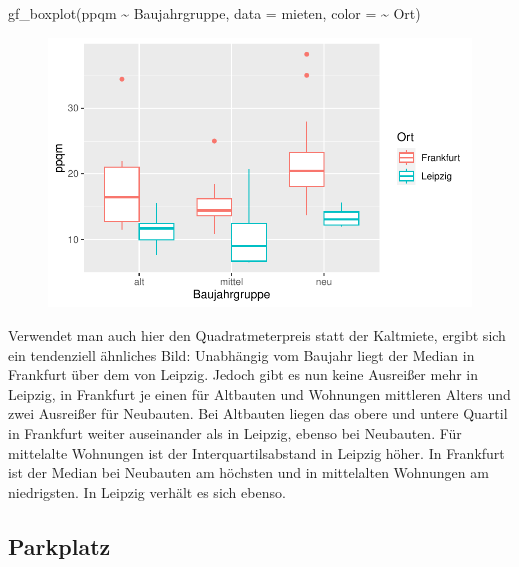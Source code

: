 \documentclass[
  a4paper,
  DIV=11]{scrartcl}
\newenvironment{Shaded}{\begin{snugshade}}{\end{snugshade}}
\newcommand{\AttributeTok}[1]{\textcolor[rgb]{0.40,0.45,0.13}{#1}}
\newcommand{\FunctionTok}[1]{\textcolor[rgb]{0.28,0.35,0.67}{#1}}
\newcommand{\NormalTok}[1]{\textcolor[rgb]{0.00,0.23,0.31}{#1}}
\newcommand{\SpecialCharTok}[1]{\textcolor[rgb]{0.37,0.37,0.37}{#1}}
\begin{document}
\begin{Shaded}
\begin{Highlighting}[]
\FunctionTok{gf\_boxplot}\NormalTok{(ppqm }\SpecialCharTok{\textasciitilde{}}\NormalTok{ Baujahrgruppe, }\AttributeTok{data =}\NormalTok{ mieten, }\AttributeTok{color =} \SpecialCharTok{\textasciitilde{}}\NormalTok{ Ort)}
\end{Highlighting}
\end{Shaded}

\begin{figure}[H]

{\centering \includegraphics{Mietmodellierung_files/figure-pdf/unnamed-chunk-17-1.pdf}

}

\end{figure}

Verwendet man auch hier den Quadratmeterpreis statt der Kaltmiete,
ergibt sich ein tendenziell ähnliches Bild: Unabhängig vom Baujahr liegt
der Median in Frankfurt über dem von Leipzig. Jedoch gibt es nun keine
Ausreißer mehr in Leipzig, in Frankfurt je einen für Altbauten und
Wohnungen mittleren Alters und zwei Ausreißer für Neubauten. Bei
Altbauten liegen das obere und untere Quartil in Frankfurt weiter
auseinander als in Leipzig, ebenso bei Neubauten. Für mittelalte
Wohnungen ist der Interquartilsabstand in Leipzig höher. In Frankfurt
ist der Median bei Neubauten am höchsten und in mittelalten Wohnungen am
niedrigsten. In Leipzig verhält es sich ebenso.

\hypertarget{parkplatz}{%
\subsection{Parkplatz}\label{parkplatz}}
\end{document}
